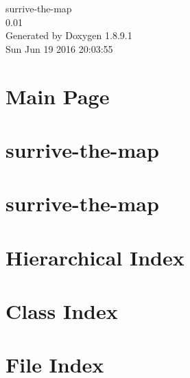 \documentclass[twoside]{book}
\newcommand{\+}{\discretionary{\mbox{\scriptsize$\hookleftarrow$}}{}{}}
\newcommand{\clearemptydoublepage}{%
  \newpage{\pagestyle{empty}\cleardoublepage}%
}
\begin{document}
\hypersetup{pageanchor=false,
             bookmarks=true,
             bookmarksnumbered=true,
             pdfencoding=unicode
            }
\begin{titlepage}
\vspace*{7cm}
\begin{center}%
{\Large surrive-\/the-\/map \\[1ex]\large 0.\+01 }\\
\vspace*{1cm}
{\large Generated by Doxygen 1.8.9.1}\\
\vspace*{0.5cm}
{\small Sun Jun 19 2016 20:03:55}\\
\end{center}
\end{titlepage}
\clearemptydoublepage
\tableofcontents
\clearemptydoublepage
{}
\hypersetup{pageanchor=true}

\chapter{Main Page}
\label{index}\hypertarget{index}{}
\chapter{surrive-\/the-\/map}
\label{md__r_e_a_d_m_e}
\hypertarget{md__r_e_a_d_m_e}{}

\chapter{surrive-\/the-\/map}
\label{md__c_1__users__foto__documents__git_hub_surrive-the-map__r_e_a_d_m_e}
\hypertarget{md__c_1__users__foto__documents__git_hub_surrive-the-map__r_e_a_d_m_e}{}

\chapter{Hierarchical Index}

\chapter{Class Index}

\chapter{File Index}

\end{document}

